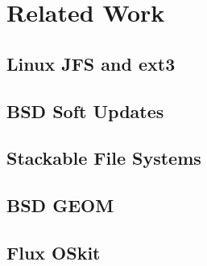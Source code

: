 \section{Related Work}
\label{sec:related}

\subsection{Linux JFS and ext3}
\subsection{BSD Soft Updates}
\subsection{Stackable File Systems}
\subsection{BSD GEOM}
\subsection{Flux OSkit}
